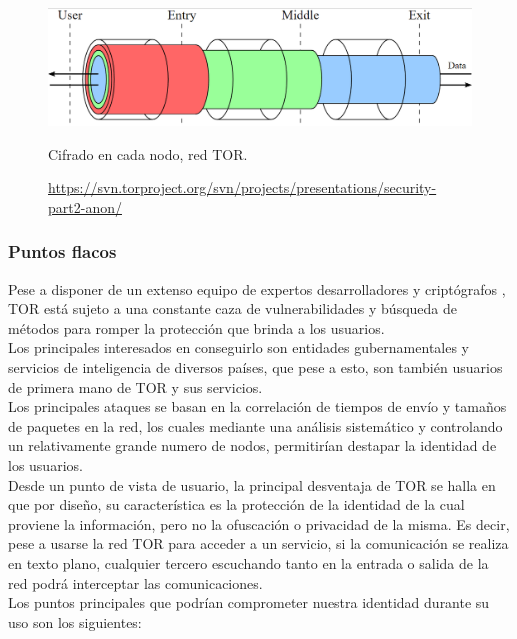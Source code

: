 \begin{figure}[H]
	\centering
	\includegraphics[width=\textwidth]{imagenes/tor_keys}
	\caption{Cifrado en cada nodo, red TOR.}
	\caption*{\small \url {https://svn.torproject.org/svn/projects/presentations/security-part2-anon/}}
	\label{fig:torkeys}
\end{figure}

\subsubsection {Puntos flacos}

Pese a disponer de un extenso equipo de expertos desarrolladores y criptógrafos \cite{TorBoard01} \cite{TorBoard02} \cite{TorBoard03} \cite{TorBoard04} \cite{TorBoard05}, TOR está sujeto a una constante caza de vulnerabilidades y búsqueda de métodos para romper la protección que brinda a los usuarios. \\
Los principales interesados en conseguirlo son entidades gubernamentales y servicios de inteligencia de diversos países, que pese a esto, son también usuarios de primera mano de TOR y sus servicios. \\ 

Los principales ataques se basan en la correlación de tiempos de envío y tamaños de paquetes en la red, los cuales mediante una análisis sistemático y controlando un relativamente grande numero de nodos, permitirían destapar la identidad de los usuarios. \\

Desde un punto de vista de usuario, la principal desventaja de TOR se halla en que por diseño, su característica es la protección de la identidad de la cual proviene la información, pero no la ofuscación o privacidad de la misma. Es decir, pese a usarse la red TOR para acceder a un servicio, si la comunicación se realiza en texto plano, cualquier tercero escuchando tanto en la entrada o salida de la red podrá interceptar las comunicaciones. \\ 

Los puntos principales que podrían comprometer nuestra identidad durante su uso son los siguientes: \\

